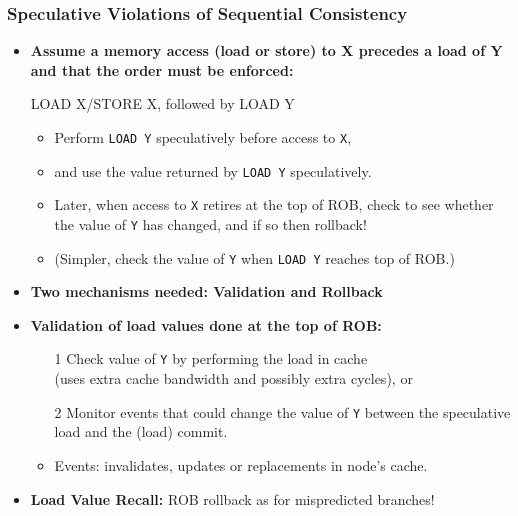 \documentclass{beamer}
\newcommand{\emp}[1]{\textcolor{DikuRed}{ #1}}
\begin{document}
\begin{frame}[fragile,t]
\frametitle{Speculative Violations of Sequential Consistency}

\begin{itemize}
\item \emp{\bf Assume a memory access (load or store) to X 
            precedes a load of Y and that the order must be enforced:}\\
\begin{colorcode}
    LOAD X/STORE X, followed by
    LOAD Y
\end{colorcode}
    \begin{itemize}
        \item Perform {\tt LOAD Y} speculatively before access to {\tt X},
        \item and use the value returned by {\tt LOAD Y} speculatively.
        \item Later, when access to {\tt X} retires at the top of ROB,
                check to see whether the value of {\tt Y} has changed,
                and if so then rollback!
        \item (Simpler, check the value of {\tt Y} when {\tt LOAD Y}
                reaches top of ROB.)
    \end{itemize}\medskip
\item \emp{\bf Two mechanisms needed: Validation and Rollback}
\item \emp{\bf Validation of load values done at the top of ROB:}\pause
    \begin{itemize}
        \item[1] Check value of {\tt Y} by performing the load in cache\\
                (uses extra cache bandwidth and possibly extra cycles), or
        \item[2] Monitor events that could change the value of {\tt Y}
                    between the speculative load and the (load) commit.
        \item Events: invalidates, updates or replacements in 
                node's cache.
    \end{itemize}\medskip

\item \alert{\bf Load Value Recall:} ROB rollback as for mispredicted branches!
\end{itemize}

\end{frame}
\end{document}
